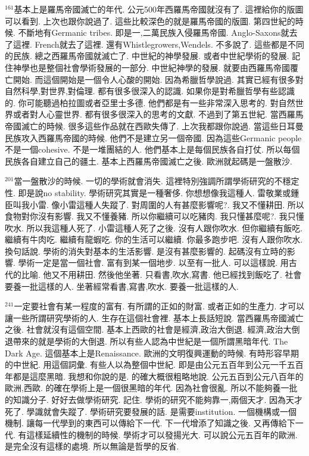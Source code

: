 \documentclass{book}
\begin{document}
$^{161}$基本上是羅馬帝國滅亡的年代.
公元500年西羅馬帝國就沒有了.
這裡給你的版圖可以看到.
上次也跟你說過了.
這些比較深色的就是羅馬帝國的版圖.
第四世紀的時候.
不斷地有Germanic tribes.
即是一,二萬民族入侵羅馬帝國.
Anglo-Saxons就去了這裡.
French就去了這裡.
還有Whistlegrowers,Wendels.
不多說了.
這些都是不同的民族.
總之西羅馬帝國就滅亡了.
中世紀的神學發展.
或者中世紀學術的發展.
記住神學也是整個社會學術發展的一部分.
中世紀神學的發展.
就要由西羅馬帝國覆亡開始.
而這個開始是一個令人心酸的開始.
因為希臘哲學說過.
其實已經有很多對自然科學,對世界,對倫理.
都有很多很深入的認識.
如果你是對希臘哲學有些認識的.
你可能聽過柏拉圖或者亞里士多德.
他們都是有一些非常深入思考的.
對自然世界或者對人心靈世界.
都有很多很深入的思考的文獻.
不過到了第五世紀.
當西羅馬帝國滅亡的時候.
很多這些作品就在西歐失傳了.
上次我都跟你說過.
當這些日耳曼民族攻入西羅馬帝國的時候.
他們不是建立另一個帝國.
因為這些Germanic people不是一個cohesive.
不是一堆團結的人.
他們基本上是每個民族各自打仗.
所以每個民族各自建立自己的疆土.
基本上西羅馬帝國滅亡之後.
歐洲就起碼是一盤散沙.

$^{201}$當一盤散沙的時候.
一切的學術就會消失.
這裡特別強調所謂學術研究的不穩定性.
即是說no stability.
學術研究其實是一種奢侈.
你想想像我這種人.
雷敬業或鍾臣叫我小雷.
像小雷這種人失蹤了.
對周圍的人有甚麼影響呢?.
我又不懂耕田.
所以食物對你沒有影響.
我又不懂養豬.
所以你繼續可以吃豬肉.
我只懂甚麼呢?.
我只懂吹水.
所以我這種人死了.
小雷這種人死了之後.
沒有人跟你吹水.
但你繼續有飯吃.
繼續有牛肉吃.
繼續有龍蝦吃.
你的生活可以繼續.
你最多跑步吧.
沒有人跟你吹水.
換句話說.
學術的消失對基本的生活影響.
是沒有甚麼影響的.
起碼沒有立時的影響.
學術一定是當一個社會.
富有到某一個地步.
以至有一批人.
可以這樣說.
用古代的比喻.
他又不用耕田.
然後他坐著.
只看書,吹水,寫書.
他已經找到飯吃了.
社會要養一批這樣的人.
坐著經常看書,寫書,吹水.
要養一批這樣的人.

$^{241}$一定要社會有某一程度的富有.
有所謂的正如的財富.
或者正如的生產力.
才可以讓一些所謂研究學術的人.
生存在這個社會裡.
基本上長話短說.
當西羅馬帝國滅亡之後.
社會就沒有這個空間.
基本上西歐的社會是經濟,政治大倒退.
經濟,政治大倒退帶來的就是學術的大倒退.
所以有些人認為中世紀是一個所謂黑暗年代.
The Dark Age.
這個基本上是Renaissance.
歐洲的文明復興運動的時候.
有時形容早期的中世紀.
用這個詞彙.
有些人以為整個中世紀.
即是由公元五百年到公元一千五百年都是這麼黑暗.
我想和你說的是.
的確大概很粗略地說.
公元五百到公元八百年的歐洲,西歐.
的確在學術上是一個很黑暗的年代.
因為社會很亂.
所以不能夠養一批的知識分子.
好好去做學術研究.
記住.
學術的研究不能夠靠一,兩個天才.
因為天才死了.
學識就會失蹤了.
學術研究要發展的話.
是需要institution.
一個機構或一個機制.
讓每一代學到的東西可以傳給下一代.
下一代增添了知識之後.
又再傳給下一代.
有這樣延續性的機制的時候.
學術才可以發揚光大.
可以說公元五百年的歐洲.
是完全沒有這樣的處境.
所以無論是哲學的反省.
\end{document}
